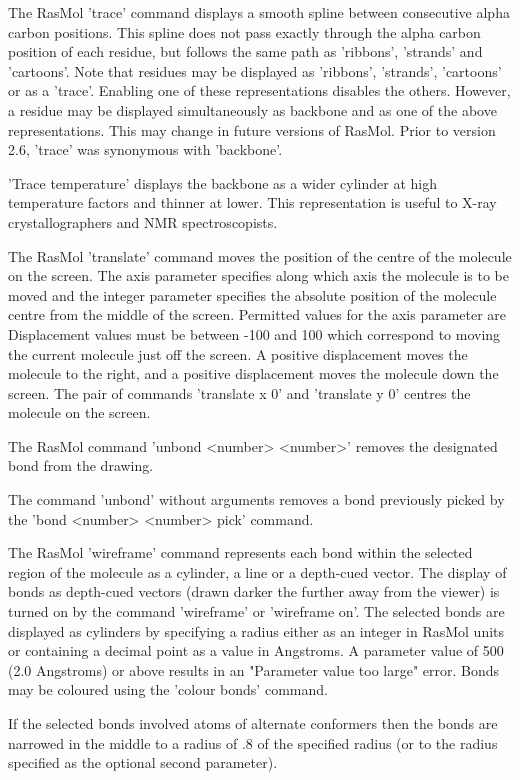 The RasMol
'trace'
command displays a smooth spline between  consecutive alpha
carbon positions.  This spline does not pass exactly through
the alpha carbon position of each residue, but  follows the
same path as
'ribbons',
'strands'
and
'cartoons'.
Note that residues may be displayed as
'ribbons',
'strands',
'cartoons'
or as a
'trace'.
Enabling one of these
representations disables the others. However, a residue
may be displayed simultaneously as backbone and as one of
the above representations.  This may change in future
versions of RasMol.  Prior to version 2.6,
'trace'
was synonymous with
'backbone'.

'Trace temperature'
displays the backbone as a wider cylinder
at high temperature factors and thinner at lower.  This
representation is useful to X-ray crystallographers and NMR spectroscopists.

The RasMol
'translate'
command moves the position of the centre of the molecule on the
screen. The axis parameter specifies along which axis the molecule
is to be moved and the integer parameter specifies the absolute
position of the molecule centre from the middle of the screen.
Permitted values for the axis parameter are
Displacement values must be between -100 and 100 which correspond to
moving the current molecule just off the screen. A positive
displacement moves the molecule to the right, and a positive
displacement moves the molecule down the screen. The pair of commands
'translate x 0'
and
'translate y 0'
centres the molecule on the screen.

The RasMol command
'unbond <number> <number>'
removes the designated bond from the drawing.

The command
'unbond'
without arguments removes a bond previously picked by the
'bond <number> <number> pick'
command.

The RasMol
'wireframe'
command represents each bond within the selected region of the molecule
as a cylinder, a line or a depth-cued vector. The display of bonds
as depth-cued vectors (drawn darker the further away from the viewer)
is turned on by the command
'wireframe'
or
'wireframe on'.
The selected bonds are displayed as cylinders by specifying a radius
either as an integer in RasMol units or containing a decimal point as
a value in Angstroms.  A parameter value of 500 (2.0 Angstroms) or
above results in an "Parameter value too large" error. Bonds may be
coloured using the
'colour bonds'
command.

If the selected bonds involved atoms of alternate conformers then
the bonds are narrowed in the middle to a radius of .8 of the specified
radius (or to the radius specified as the optional second parameter).

